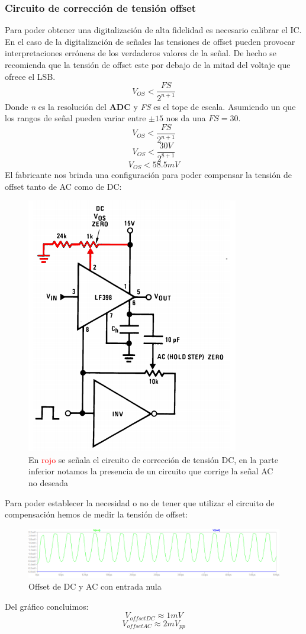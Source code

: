 \subsubsection{Circuito de corrección de tensión offset}
 Para poder obtener una digitalización de alta fidelidad es necesario calibrar el IC. En el caso de la digitalización de señales las tensiones de offset pueden provocar interpretaciones erróneas de los verdaderos valores de la señal. De hecho se recomienda que la tensión de offset este por debajo de la mitad del voltaje que ofrece el LSB.
 $$
 V_{OS} < \frac{FS}{2^{n+1}} 
 $$
Donde \textit{n }es la resolución del \textbf{ADC}
y \textit{FS} es el tope de escala.
Asumiendo un que los rangos de señal pueden variar entre $\pm15$ nos da una $FS=30$.
$$V_{OS}<\frac{FS}{2^{n+1}}$$
$$V_{OS}<\frac{30V}{2^{8+1}}$$
$$V_{OS}<58.5mV$$
El fabricante nos brinda una configuración para poder compensar la tensión de offset tanto de AC como de DC:
\begin{figure}[H]
	\centering
	\includegraphics[scale=0.6]{ImagenesEjercicio4/DCcolorized}
	\caption{En \textcolor{red}{rojo} se señala el circuito de corrección de tensión DC, en la parte inferior notamos la presencia de un circuito que corrige la señal AC no deseada}
	\label{fig:dccolorized}
\end{figure}
Para poder establecer la necesidad o no de tener que utilizar el circuito de compensación hemos de medir la tensión de offset:
\begin{figure}[H]
	\centering
	\includegraphics[width=\linewidth]{ImagenesEjercicio4/DCACoffset}
	\caption{Offset de DC y AC con entrada nula}
	\label{fig:dcacoffset}
\end{figure}
Del gráfico concluimos:
$$V_{offset DC}\approx 1mV$$
$$V_{offset AC}\approx 2mV_{pp}$$

